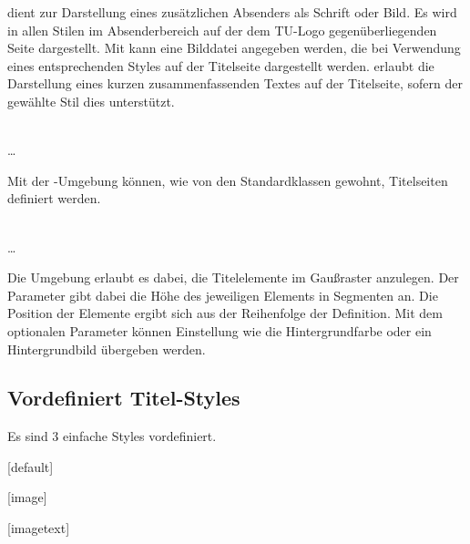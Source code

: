 \documentclass[a4paper,11pt]{tubsreprt}
\begin{document}
 dient zur Darstellung eines zusätzlichen Absenders als Schrift
oder Bild. Es wird in allen Stilen im Absenderbereich auf der dem
TU-Logo gegenüberliegenden Seite dargestellt.
Mit  kann eine Bilddatei angegeben werden, die bei
Verwendung eines entsprechenden Styles auf der Titelseite dargestellt werden.
 erlaubt die Darstellung eines kurzen zusammenfassenden
Textes auf der Titelseite, sofern der gewählte Stil dies unterstützt.

\begin{Declaration}
  \\
  \quad\dots\\
\end{Declaration}

Mit der -Umgebung können, wie von den Standardklassen
gewohnt, Titelseiten definiert werden.

\begin{Declaration}
    \\
  \quad\dots\\
\end{Declaration}

Die Umgebung  erlaubt es dabei, die Titelelemente im 
Gaußraster anzulegen. Der Parameter  gibt dabei
die Höhe des jeweiligen Elements in Segmenten an. Die Position der Elemente
ergibt sich aus der Reihenfolge der Definition.
Mit dem optionalen Parameter  können Einstellung wie die Hintergrundfarbe oder ein Hintergrundbild übergeben werden.

\subsection{Vordefiniert Titel-Styles}

Es sind 3 einfache Styles vordefiniert.

\begin{center}
  \begin{minipage}[t]{0.33\textwidth}
    \centering\sffamily
    [default]
  \end{minipage}%
  \begin{minipage}[t]{0.33\textwidth}
    \centering\sffamily
    [image]
  \end{minipage}%
  \begin{minipage}[t]{0.33\textwidth}
    \centering\sffamily
    [imagetext]
  \end{minipage}

\end{center}
\end{document}
